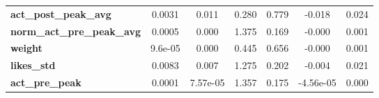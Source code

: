 \begin{center}
\begin{tabular}{lcccccc}
\textbf{act\_post\_peak\_avg}      &       0.0031  &        0.011     &     0.280  &         0.779        &       -0.018    &        0.024     \\
\textbf{norm\_act\_pre\_peak\_avg} &       0.0005  &        0.000     &     1.375  &         0.169        &       -0.000    &        0.001     \\
\textbf{weight}                    &      9.6e-05  &        0.000     &     0.445  &         0.656        &       -0.000    &        0.001     \\
\textbf{likes\_std}                &       0.0083  &        0.007     &     1.275  &         0.202        &       -0.004    &        0.021     \\
\textbf{act\_pre\_peak}            &       0.0001  &     7.57e-05     &     1.357  &         0.175        &    -4.56e-05    &        0.000     \\
\bottomrule
\end{tabular}
\end{center}